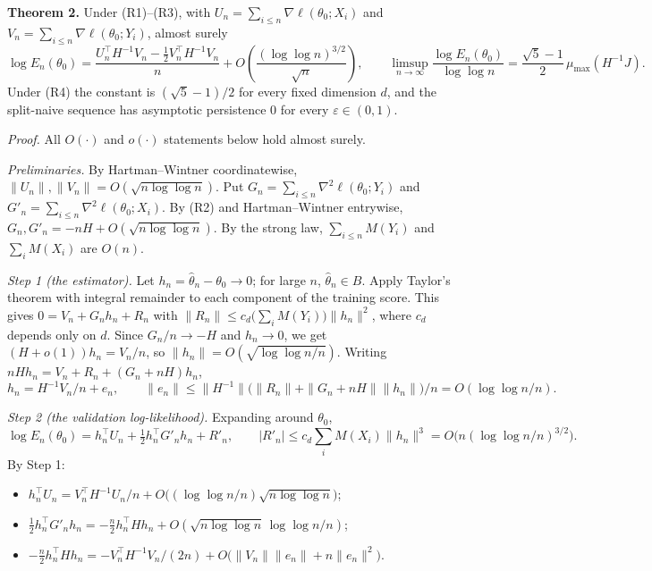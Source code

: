 \documentclass[
  10pt,
  a4paper,
]{article}
\providecommand{\tightlist}{%
  \setlength{\itemsep}{0pt}\setlength{\parskip}{0pt}}
\begin{document}
\textbf{Theorem 2.} Under (R1)--(R3), with
\(U_n=\sum_{i\le n}\nabla\ell(\theta_0;X_i)\) and
\(V_n=\sum_{i\le n}\nabla\ell(\theta_0;Y_i)\), almost surely \[
\log E_n(\theta_0)=\frac{U_n^\top H^{-1}V_n-\tfrac12V_n^\top H^{-1}V_n}{n}+O\!\left(\frac{(\log\log n)^{3/2}}{\sqrt n}\right),
\qquad
\limsup_{n\to\infty}\frac{\log E_n(\theta_0)}{\log\log n}=\frac{\sqrt5-1}{2}\,\mu_{\max}(H^{-1}J).
\] Under (R4) the constant is \((\sqrt5-1)/2\) for every fixed dimension
\(d\), and the split-naive sequence has asymptotic persistence \(0\) for
every \(\varepsilon\in(0,1)\).

\emph{Proof.} All \(O(\cdot)\) and \(o(\cdot)\) statements below hold
almost surely.

\emph{Preliminaries.} By Hartman--Wintner coordinatewise,
\(\|U_n\|,\|V_n\|=O(\sqrt{n\log\log n})\). Put
\(G_n=\sum_{i\le n}\nabla^2\ell(\theta_0;Y_i)\) and
\(G'_n=\sum_{i\le n}\nabla^2\ell(\theta_0;X_i)\). By (R2) and
Hartman--Wintner entrywise, \(G_n,G'_n=-nH+O(\sqrt{n\log\log n})\). By
the strong law, \(\sum_{i\le n}M(Y_i)\) and \(\sum_iM(X_i)\) are
\(O(n)\).

\emph{Step 1 (the estimator).} Let \(h_n=\hat\theta_n-\theta_0\to0\);
for large \(n\), \(\hat\theta_n\in B\). Apply Taylor's theorem with
integral remainder to each component of the training score. This gives
\(0=V_n+G_nh_n+R_n\) with
\(\|R_n\|\le c_d\big(\sum_iM(Y_i)\big)\|h_n\|^2\), where \(c_d\) depends
only on \(d\). Since \(G_n/n\to-H\) and \(h_n\to0\), we get
\((H+o(1))h_n=V_n/n\), so \(\|h_n\|=O(\sqrt{\log\log n/n})\). Writing
\(nHh_n=V_n+R_n+(G_n+nH)h_n\), \[
h_n=H^{-1}V_n/n+e_n,\qquad\|e_n\|\le\|H^{-1}\|\big(\|R_n\|+\|G_n+nH\|\|h_n\|\big)/n=O(\log\log n/n).
\]

\emph{Step 2 (the validation log-likelihood).} Expanding around
\(\theta_0\),
\[\log E_n(\theta_0)=h_n^\top U_n+\tfrac12h_n^\top G'_nh_n+R'_n,\qquad |R'_n|\le c_d\textstyle\sum_iM(X_i)\|h_n\|^3=O\big(n(\log\log n/n)^{3/2}\big).\]
By Step 1:

\begin{itemize}
\tightlist
\item
  \(h_n^\top U_n=V_n^\top H^{-1}U_n/n+O\big((\log\log n/n)\sqrt{n\log\log n}\big)\);
\item
  \(\tfrac12h_n^\top G'_nh_n=-\tfrac n2h_n^\top Hh_n+O(\sqrt{n\log\log n}\,\log\log n/n)\);
\item
  \(-\tfrac n2h_n^\top Hh_n=-V_n^\top H^{-1}V_n/(2n)+O\big(\|V_n\|\|e_n\|+n\|e_n\|^2\big)\).
\end{itemize}
\end{document}
